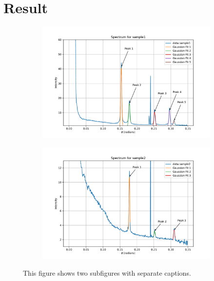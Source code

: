 \section{Result}

\begin{figure}[H]
    \centering
    \begin{subfigure}[b]{0.99\textwidth} 
        \includegraphics[width=\textwidth]{Figures/gaussian_sample1.pdf}
        \label{fig:subfigure1}
    \end{subfigure}
    \begin{subfigure}[b]{0.99\textwidth} 
        \includegraphics[width=\textwidth]{Figures/gaussian_sample2.pdf}
        \label{fig:subfigure2}
    \end{subfigure}
    \caption{This figure shows two subfigures with separate captions.}
    \label{fig:result_figure}
\end{figure}

